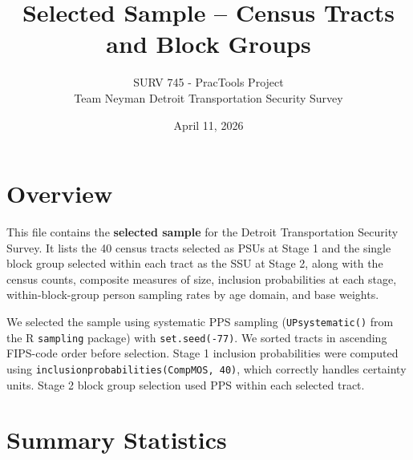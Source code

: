 \documentclass[
  11pt,
]{article}
\title{Selected Sample -- Census Tracts and Block Groups}
\subtitle{SURV 745 - PracTools Project\\
Team Neyman \textbar{} Detroit Transportation Security Survey}
\author{}
\date{\vspace{-2.5em}April 11, 2026}
\begin{document}
\maketitle

\section{Overview}\label{overview}

This file contains the \textbf{selected sample} for the Detroit
Transportation Security Survey. It lists the 40 census tracts selected
as PSUs at Stage 1 and the single block group selected within each tract
as the SSU at Stage 2, along with the census counts, composite measures
of size, inclusion probabilities at each stage, within-block-group
person sampling rates by age domain, and base weights.

We selected the sample using systematic PPS sampling
(\texttt{UPsystematic()} from the R \texttt{sampling} package) with
\texttt{set.seed(-77)}. We sorted tracts in ascending FIPS-code order
before selection. Stage 1 inclusion probabilities were computed using
\texttt{inclusionprobabilities(CompMOS,\ 40)}, which correctly handles
certainty units. Stage 2 block group selection used PPS within each
selected tract.

\section{Summary Statistics}\label{summary-statistics}
\end{document}
